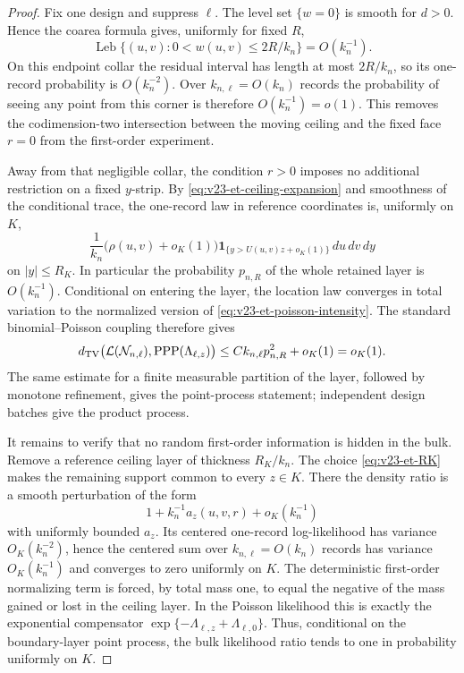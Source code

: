 \begin{proof}
Fix one design and suppress \(\ell\).  The level set \(\{w=0\}\) is smooth
for \(d>0\).  Hence the coarea formula gives, uniformly for fixed \(R\),
\begin{equation}\label{eq:v23-et-corner-area}
 \operatorname{Leb}\{(u,v):0<w(u,v)\le 2R/k_n\}=O(k_n^{-1}).
\end{equation}
On this endpoint collar the residual interval has length at most
\(2R/k_n\), so its one-record probability is \(O(k_n^{-2})\).  Over
\(k_{n,\ell}=O(k_n)\) records the probability of seeing any point from this
corner is therefore \(O(k_n^{-1})=o(1)\).  This removes the codimension-two
intersection between the moving ceiling and the fixed face \(r=0\) from the
first-order experiment.

Away from that negligible collar, the condition \(r>0\) imposes no additional
restriction on a fixed \(y\)-strip.  By
\eqref{eq:v23-et-ceiling-expansion} and smoothness of the conditional trace,
the one-record law in reference coordinates is, uniformly on \(K\),
\begin{equation}\label{eq:v23-et-rare-density}
 \frac1{k_n}
 \bigl(\rho(u,v)+o_K(1)\bigr)
 \mathbf 1_{\{y>U(u,v)z+o_K(1)\}}
 \,du\,dv\,dy
\end{equation}
on \(|y|\le R_K\).  In particular the probability \(p_{n,R}\) of the whole
retained layer is \(O(k_n^{-1})\).  Conditional on entering the layer, the
location law converges in total variation to the normalized version of
\eqref{eq:v23-et-poisson-intensity}.  The standard binomial--Poisson coupling
therefore gives
\begin{equation}\label{eq:v23-et-poisson-tv}
 d_{\rm TV}\bigl(
   \mathcal L(\mathcal N_{n,\ell}),
   \operatorname{PPP}(\Lambda_{\ell,z})
 \bigr)
 \le C k_{n,\ell}p_{n,R}^2+o_K(1)=o_K(1).
\end{equation}
The same estimate for a finite measurable partition of the layer, followed by
monotone refinement, gives the point-process statement; independent design
batches give the product process.

It remains to verify that no random first-order information is hidden in the
bulk.  Remove a reference ceiling layer of thickness \(R_K/k_n\).  The choice
\eqref{eq:v23-et-RK} makes the remaining support common to every \(z\in K\).
There the density ratio is a smooth perturbation of the form
\[
 1+k_n^{-1}a_z(u,v,r)+o_K(k_n^{-1})
\]
with uniformly bounded \(a_z\).  Its centered one-record log-likelihood has
variance \(O_K(k_n^{-2})\), hence the centered sum over
\(k_{n,\ell}=O(k_n)\) records has variance \(O_K(k_n^{-1})\) and converges to
zero uniformly on \(K\).  The deterministic first-order normalizing term is
forced, by total mass one, to equal the negative of the mass gained or lost in
the ceiling layer.  In the Poisson likelihood this is exactly the exponential
compensator
\(\exp\{-\Lambda_{\ell,z}+\Lambda_{\ell,0}\}\).
Thus, conditional on the boundary-layer point process, the bulk likelihood
ratio tends to one in probability uniformly on \(K\).


\end{proof}
